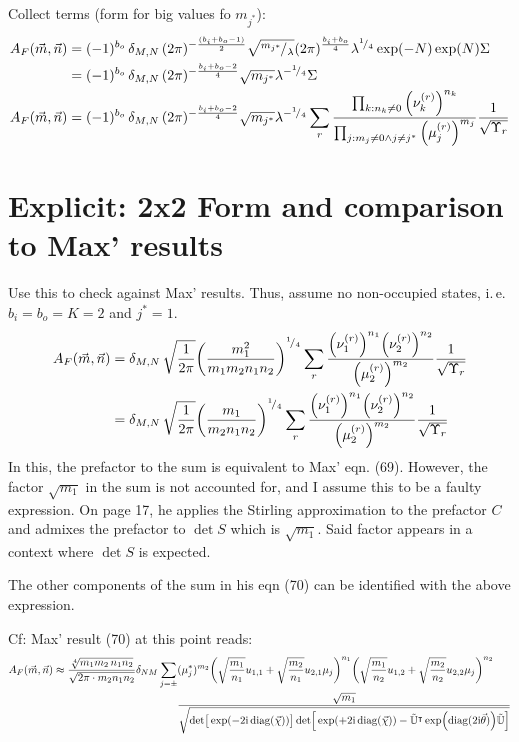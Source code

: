\documentclass[
	english,
	a4paper,
	fontsize=10pt,
	parskip=half,
	titlepage=true,
	DIV=12,
	final
]{scrreprt}
\newcommand*{\ie}{i.\,e.\xspace}
\newcommand*{\smallfrac}  [2]{\ensuremath{{}^        {#1} \!/_        {#2}}}
\newcommand*{\transp}{\ensuremath{^\intercal}}
\newcommand*{\iunit}{\ensuremath{\mathrm{i}}}
\DeclareMathOperator{\diag}{diag}
\begin{document}
Collect terms (form for big values fo $m_{j^*}$):
\begin{align}
		A_F(\vec{m}, \vec{n})
&=
	(-1)^{b_o} \,	
	\delta_{M,N} \,
	(2\pi)^{-\frac{(b_i + b_o - 1)}{2}}
	\sqrt{\smallfrac{m_{j^*}}{\lambda}}
	(2\pi)^{\frac{b_i + b_o}{4}}
	\lambda^{\smallfrac{1}{4}}
	\exp(-N)
	\exp(N)
	\Sigma \\
&=
	(-1)^{b_o} \,	
	\delta_{M,N} \,
	(2\pi)^{-\frac{b_i + b_o - 2}{4}}
	\sqrt{m_{j^*}}
	\lambda^{-\smallfrac{1}{4}}
	\Sigma
\\
		A_F(\vec{m}, \vec{n})
&=
	(-1)^{b_o} \,	
	\delta_{M,N} \,
	(2\pi)^{-\frac{b_i + b_o - 2}{4}}
	\sqrt{m_{j^*}}
	\lambda^{-\smallfrac{1}{4}}
	\sum_{r}	
		\frac
			{\prod_{k : n_k \neq 0}                  \qty(\nu_k^{(r)})^{n_k}}
			{\prod_{j : m_j \neq 0 \land j \neq j^*} \qty(\mu_j^{(r)})^{m_j}}
		\frac{1}{\sqrt{\Upsilon_r}}
\end{align}

\section{Explicit: 2x2 Form and comparison to Max' results}
Use this to check against Max' results. Thus, assume no non-occupied states, \ie $b_i = b_o = K = 2$ and $j^* = 1$.
\begin{align}
		A_F(\vec{m}, \vec{n})
&=
	\delta_{M,N} \,
	\sqrt{\frac{1}{2\pi}}
	\qty(
		\frac{m_1^2}{m_1 m_2 n_1 n_2}
	)^{\smallfrac{1}{4}}
	\sum_{r}	
		\frac
			{\qty(\nu_1^{(r)})^{n_1}   \qty(\nu_2^{(r)})^{n_2}}
			{\qty(\mu_2^{(r)})^{m_2}}
		\frac{1}{\sqrt{\Upsilon_r}} \\
&=
	\delta_{M,N} \,
	\sqrt{\frac{1}{2\pi}}
	\qty(
		\frac{m_1}{m_2 n_1 n_2}
	)^{\smallfrac{1}{4}}
	\sum_{r}	
		\frac
			{\qty(\nu_1^{(r)})^{n_1}   \qty(\nu_2^{(r)})^{n_2}}
			{\qty(\mu_2^{(r)})^{m_2}}
		\frac{1}{\sqrt{\Upsilon_r}}
\end{align}
In this, the prefactor to the sum is equivalent to Max' eqn. (69). However, the factor $\sqrt{m_1}$ in the sum is not accounted for, and I assume this to be a faulty expression. On page 17, he applies the Stirling approximation to the prefactor $C$ and admixes the prefactor to $\det S$ which is $\sqrt{m_1}$. Said factor appears in a context where $\det S$ is expected.

The other components of the sum in his eqn (70) can be identified with the above expression.

Cf: Max' result (70) at this point reads:
\begin{align*}
	A_F(\vec{m}, \vec{n})
\approx
	\frac
		{\sqrt[4]{m_1 m_2 \, n_1 n_2}}
		{\sqrt{2\pi \cdot m_2 n_1 n_2}}
	\delta_{NM}
	\sum_{j = \pm}
&
		(\mu_j^*)^{m_2}
		\qty(
			\sqrt{\frac{m_1}{n_1}} u_{1,1} +
			\sqrt{\frac{m_2}{n_1}} u_{2,1} \mu_j
		)^{n_1}
		\qty(
			\sqrt{\frac{m_1}{n_2}} u_{1,2} +
			\sqrt{\frac{m_2}{n_2}} u_{2,2} \mu_j
		)^{n_2}
\\ &
	\frac
		{\sqrt{m_1}}
		{\sqrt{
			\det[\big. \exp(-2\iunit \diag(\vec{\chi}))]
			\det[
				\big. \exp(+2\iunit \diag(\vec{\chi})) - 
				\tilde{\mathbb{U}}\transp \exp(\diag(2\iunit \vec{\theta})) \tilde{\mathbb{U}}
			]
		}}
\end{align*}
\end{document}
